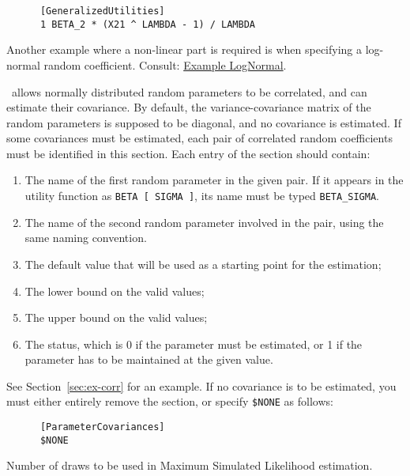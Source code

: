 \documentclass[12pt]{memoir}
\begin{document}
\begin{description}
{\begin{verbatim}
      [GeneralizedUtilities]
      1 BETA_2 * (X21 ^ LAMBDA - 1) / LAMBDA
      \end{verbatim}
}
      \normalsize
      
      Another example where a non-linear part is required is when specifying a log-normal 
      random coefficient. Consult: \hyperlink{Example LogNormal}{Example LogNormal}. 
      
   \item[\specitem{ParameterCovariances}]
      \BIOGEME\ allows normally distributed random parameters to be correlated, and can estimate
      their covariance. By default, the variance-covariance matrix of the
      random parameters is supposed to be diagonal, and no covariance is
      estimated. If some covariances must be estimated, each pair of correlated 
      random coefficients must be identified in this section. 
      Each entry of the section should contain: 
      \begin{enumerate}
         \item The name of the first random parameter in the given pair. If it appears in the
            utility function as \verb+BETA [ SIGMA ]+, its name must be typed
            \verb+BETA_SIGMA+. 
         \item The name of the second random parameter involved in the pair, using the same naming
            convention. 
         \item The default value that will be used as a starting point for the estimation;
         \item The lower bound on the valid values;
         \item The upper bound on the valid values;
         \item The status, which is 0 if the parameter must be estimated, or 1 if the parameter 
            has to be maintained at the given value. 
      \end{enumerate}
      See Section~\ref{sec:ex-corr} for an example.
      If no covariance is to be estimated, you must either entirely remove
      the section, or specify \verb+$NONE+ as follows:
      \footnotesize
{\footnotesize
      \begin{verbatim}
      [ParameterCovariances]
      $NONE
      \end{verbatim}
}
      \normalsize


   \item[\specitem{Draws}] Number of draws to be used in Maximum Simulated Likelihood estimation. 


\end{description}
\end{document}
